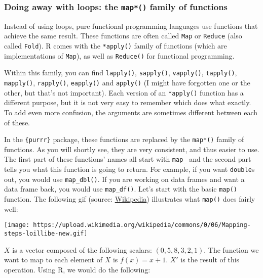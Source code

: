 \documentclass[
]{article}
\begin{document}
\hypertarget{doing-away-with-loops-the-map-family-of-functions}{%
\subsubsection{\texorpdfstring{Doing away with loops: the \texttt{map*()} family of functions}{Doing away with loops: the map*() family of functions}}\label{doing-away-with-loops-the-map-family-of-functions}}

Instead of using loops, pure functional programming languages use functions that achieve
the same result. These functions are often called \texttt{Map} or \texttt{Reduce} (also called \texttt{Fold}). R comes
with the \texttt{*apply()} family of functions (which are implementations of \texttt{Map}),
as well as \texttt{Reduce()} for functional programming.

Within this family, you can find \texttt{lapply()}, \texttt{sapply()}, \texttt{vapply()}, \texttt{tapply()}, \texttt{mapply()}, \texttt{rapply()},
\texttt{eapply()} and \texttt{apply()} (I might have forgotten one or the other, but that's not important).
Each version of an \texttt{*apply()} function has a different purpose, but it is not very easy to
remember which does what exactly. To add even more confusion, the arguments are sometimes different between
each of these.

In the \texttt{\{purrr\}} package, these functions are replaced by the \texttt{map*()} family of functions. As you will
shortly see, they are very consistent, and thus easier to use.
The first part of these functions' names all start with \texttt{map\_} and the second part tells you what
this function is going to return. For example, if you want \texttt{double}s out, you would use \texttt{map\_dbl()}.
If you are working on data frames and want a data frame back, you would use \texttt{map\_df()}. Let's start
with the basic \texttt{map()} function. The following gif
(source: \href{https://en.wikipedia.org/wiki/Map_(higher-order_function)}{Wikipedia}) illustrates
what \texttt{map()} does fairly well:

\texttt{[image: https://upload.wikimedia.org/wikipedia/commons/0/06/Mapping-steps-loillibe-new.gif]}

\(X\) is a vector composed of the following scalars: \((0, 5, 8, 3, 2, 1)\). The function we want to
map to each element of \(X\) is \(f(x) = x + 1\). \(X'\) is the result of this operation. Using R, we
would do the following:
\end{document}
